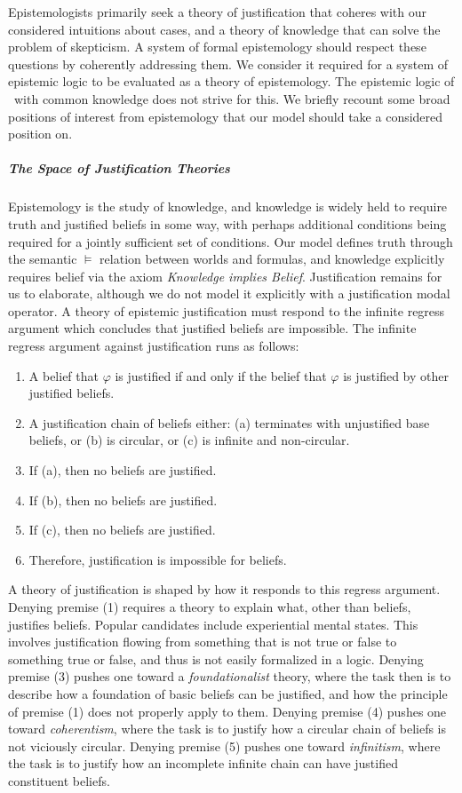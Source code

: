 Epistemologists primarily seek a theory of justification that coheres with our considered intuitions about cases, and a theory of knowledge that can solve the problem of skepticism. A system of formal epistemology should respect these questions by coherently addressing them. We consider it required for a system of epistemic logic to be evaluated as a theory of epistemology. The epistemic logic of \SFive\ with common knowledge does not strive for this. We briefly recount some broad positions of interest from epistemology that our model should take a considered position on.


\subparagraph{The Space of Justification Theories}
Epistemology is the study of knowledge, and knowledge is widely held to require truth and justified beliefs in some way, with perhaps additional conditions being required for a jointly sufficient set of conditions. Our model defines truth through the semantic $\models$ relation between worlds and formulas, and knowledge explicitly requires belief via the axiom \emph{Knowledge implies Belief}. Justification remains for us to elaborate, although we do not model it explicitly with a justification modal operator. A theory of epistemic justification must respond to the infinite regress argument which concludes that justified beliefs are impossible. The infinite regress argument against justification runs as follows:
\begin{enumerate}
	\item A belief that $\varphi$ is justified if and only if the belief that $\varphi$ is justified by other justified beliefs.
	\item A justification chain of beliefs either: (a) terminates with unjustified base beliefs, or (b) is circular, or (c) is infinite and non-circular.
	\item If (a), then no beliefs are justified.
	\item If (b), then no beliefs are justified.
	\item If (c), then no beliefs are justified.
	\item Therefore, justification is impossible for beliefs.
\end{enumerate}
A theory of justification is shaped by how it responds to this regress argument. Denying premise (1) requires a theory to explain what, other than beliefs, justifies beliefs. Popular candidates include experiential mental states. This involves justification flowing from something that is not true or false to something true or false, and thus is not easily formalized in a logic. Denying premise (3) pushes one toward a \emph{foundationalist} theory, where the task then is to describe how a foundation of basic beliefs can be justified, and how the principle of premise (1) does not properly apply to them. Denying premise (4) pushes one toward \emph{coherentism}, where the task is to justify how a circular chain of beliefs is not viciously circular. Denying premise (5) pushes one toward \emph{infinitism}, where the task is to justify how an incomplete infinite chain can have justified constituent beliefs.

